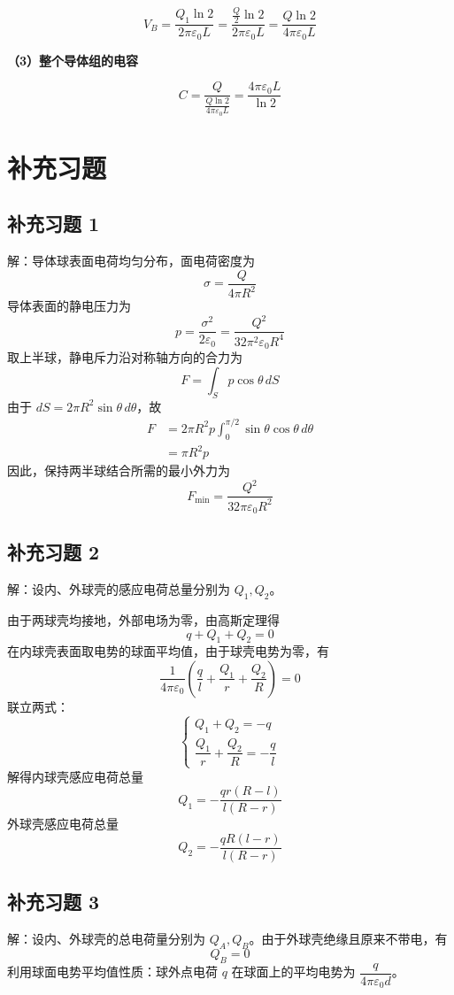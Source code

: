 \documentclass[UTF8,a4paper,12pt]{ctexart}
\begin{document}
\[
V_B
=
\frac{Q_1\ln 2}{2\pi\varepsilon_0L}
=
\frac{\frac{Q}{2}\ln 2}{2\pi\varepsilon_0L}
=
\frac{Q\ln 2}{4\pi\varepsilon_0L}
\]

\textbf{（3）整个导体组的电容}

\[
C
=
\frac{Q}{\frac{Q\ln 2}{4\pi\varepsilon_0L}}
=
\frac{4\pi\varepsilon_0L}{\ln 2}
\]

\section*{补充习题}

\subsection*{补充习题 1}

解：导体球表面电荷均匀分布，面电荷密度为
\[
\sigma=\frac{Q}{4\pi R^2}
\]
导体表面的静电压力为
\[
p=\frac{\sigma^2}{2\varepsilon_0}
=\frac{Q^2}{32\pi^2\varepsilon_0R^4}
\]
取上半球，静电斥力沿对称轴方向的合力为
\[
F=\int_S p\cos\theta\,dS
\]
由于 $dS=2\pi R^2\sin\theta\,d\theta$，故
\[
\begin{aligned}
F
&=
2\pi R^2p\int_0^{\pi/2}\sin\theta\cos\theta\,d\theta\\
&=
\pi R^2p
\end{aligned}
\]
因此，保持两半球结合所需的最小外力为
\[
F_{\min}=\frac{Q^2}{32\pi\varepsilon_0R^2}
\]

\subsection*{补充习题 2}

解：设内、外球壳的感应电荷总量分别为 $Q_1,Q_2$。

由于两球壳均接地，外部电场为零，由高斯定理得
\[
q+Q_1+Q_2=0
\]
在内球壳表面取电势的球面平均值，由于球壳电势为零，有
\[
\frac{1}{4\pi\varepsilon_0}
\left(
\frac{q}{l}+\frac{Q_1}{r}+\frac{Q_2}{R}
\right)
=0
\]
联立两式：
\[
\begin{cases}
Q_1+Q_2=-q\\
\dfrac{Q_1}{r}+\dfrac{Q_2}{R}=-\dfrac{q}{l}
\end{cases}
\]
解得内球壳感应电荷总量
\[
\boxed{Q_1=-\frac{qr(R-l)}{l(R-r)}}
\]
外球壳感应电荷总量
\[
Q_2=-\frac{qR(l-r)}{l(R-r)}
\]

\subsection*{补充习题 3}

解：设内、外球壳的总电荷量分别为 $Q_A,Q_B$。由于外球壳绝缘且原来不带电，有
\[
Q_B=0
\]
利用球面电势平均值性质：球外点电荷 $q$ 在球面上的平均电势为 $\dfrac{q}{4\pi\varepsilon_0d}$。
\end{document}

